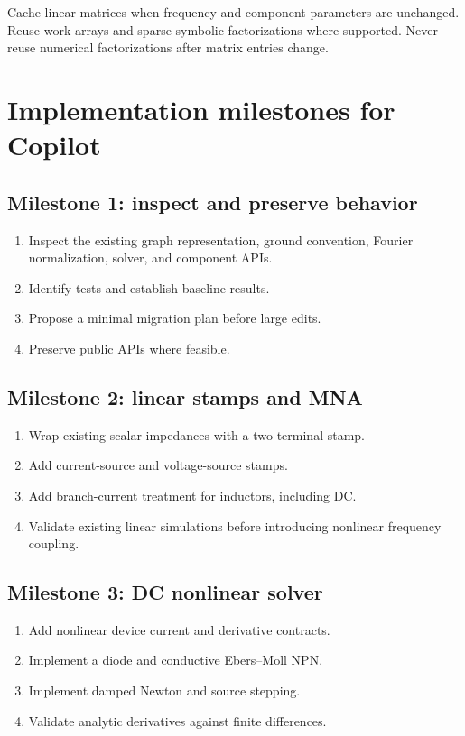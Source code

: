 \documentclass[11pt,a4paper]{article}
\begin{document}
Cache linear matrices when frequency and component parameters are
unchanged. Reuse work arrays and sparse symbolic factorizations where
supported. Never reuse numerical factorizations after matrix entries
change.

\section{Implementation milestones for Copilot}

\subsection*{Milestone 1: inspect and preserve behavior}
\begin{enumerate}
 \item Inspect the existing graph representation, ground convention,
       Fourier normalization, solver, and component APIs.
 \item Identify tests and establish baseline results.
 \item Propose a minimal migration plan before large edits.
 \item Preserve public APIs where feasible.
\end{enumerate}

\subsection*{Milestone 2: linear stamps and MNA}
\begin{enumerate}
 \item Wrap existing scalar impedances with a two-terminal stamp.
 \item Add current-source and voltage-source stamps.
 \item Add branch-current treatment for inductors, including DC.
 \item Validate existing linear simulations before introducing nonlinear
       frequency coupling.
\end{enumerate}

\subsection*{Milestone 3: DC nonlinear solver}
\begin{enumerate}
 \item Add nonlinear device current and derivative contracts.
 \item Implement a diode and conductive Ebers--Moll NPN.
 \item Implement damped Newton and source stepping.
 \item Validate analytic derivatives against finite differences.
\end{enumerate}
\end{document}
